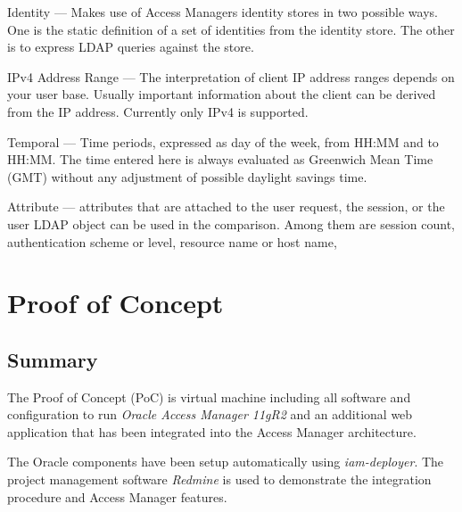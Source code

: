 \documentclass[11pt]{report}
\begin{document}
\begin{description}

    \item{Identity} --- Makes use of Access Managers identity stores in two
        possible ways. One is the static definition of a set of identities from
        the identity store. The other is to express LDAP queries against the
        store.

    \item{IPv4 Address Range} --- The interpretation of client IP address
        ranges depends on your user base. Usually important information about
        the client can be derived from the IP address. Currently only IPv4 is
        supported.

    \item{Temporal} --- Time periods, expressed as day of the week, from HH:MM
        and to HH:MM\@.  The time entered here is always evaluated as Greenwich
        Mean Time (GMT) without any adjustment of possible daylight savings
        time.

    \item{Attribute} --- attributes that are attached to the user request, the
        session, or the user LDAP object can be used in the comparison. Among
        them are session count, authentication scheme or level, resource name
        or host name,

\end{description}



\chapter{Proof of Concept}

\section{Summary}

The Proof of Concept (PoC) is virtual machine including all software and
configuration to run \emph{Oracle Access Manager 11gR2} and an additional web
application that has been integrated into the Access Manager architecture.

The Oracle components have been setup automatically using \emph{iam-deployer}.
The project management software \emph{Redmine} is used to demonstrate the
integration procedure and Access Manager features.
\end{document}

